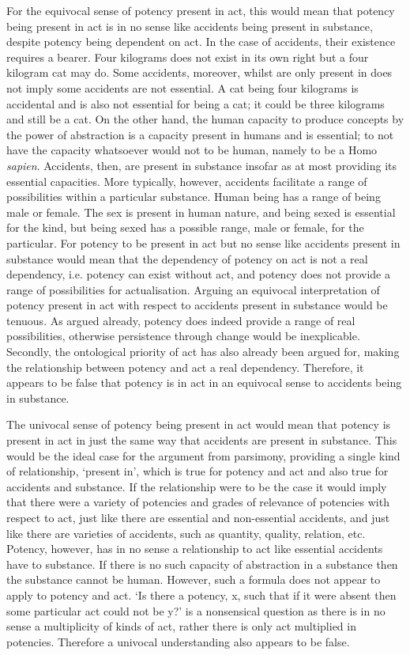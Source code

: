 For the equivocal sense of potency present in act, this would mean that potency being present in act is in no sense like accidents being present in substance, despite potency being dependent on act. In the case of accidents, their existence requires a bearer. Four kilograms does not exist in its own right but a four kilogram cat may do. Some accidents, moreover, whilst are only present in does not imply some accidents are not essential. A cat being four kilograms is accidental and is also not essential for being a cat; it could be three kilograms and still be a cat. On the other hand, the human capacity to produce concepts by the power of abstraction is a capacity present in humans and is essential; to not have the capacity whatsoever would not to be human, namely to be a Homo \emph{sapien}.  Accidents, then, are present in substance insofar as at most providing its essential capacities. More typically, however, accidents facilitate a range of possibilities within a particular substance. Human being has a range of being male or female. The sex is present in human nature, and being sexed is essential for the kind, but being sexed has a possible range, male or female, for the particular. For potency to be present in act but no sense like accidents present in substance would mean that the dependency of potency on act is not a real dependency, i.e. potency can exist without act, and potency does not provide a range of possibilities for actualisation. Arguing an equivocal interpretation of potency present in act with respect to accidents present in substance would be tenuous. As argued already, potency does indeed provide a range of real possibilities, otherwise persistence through change would be inexplicable. Secondly, the ontological priority of act has also already been argued for, making the relationship between potency and act a real dependency. Therefore, it appears to be false that potency is in act in an equivocal sense to accidents being in substance.

The univocal sense of potency being present in act would mean that potency is present in act in just the same way that accidents are present in substance. This would be the ideal case for the argument from parsimony, providing a single kind of relationship, `present in', which is true for potency and act and also true for accidents and substance. If the relationship were to be the case it would imply that there were a variety of potencies and grades of relevance of potencies with respect to act, just like there are essential and non-essential accidents, and just like there are varieties of accidents, such as quantity, quality, relation, etc. Potency, however, has in no sense a relationship to act like essential accidents have to substance. If there is no such capacity of abstraction in a substance then the substance cannot be human. However, such a formula does not appear to apply to potency and act. `Is there a potency, x, such that if it were absent then some particular act could not be y?' is a nonsensical question as there is in no sense a multiplicity of kinds of act, rather there is only act multiplied in potencies. Therefore a univocal understanding also appears to be false.

